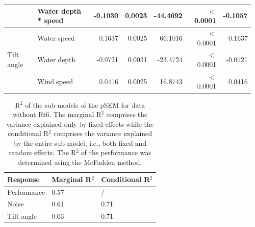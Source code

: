 \documentclass[doublespacing,linenumbers]{bmcart}
\begin{document}
\begin{backmatter}
\begin{table}[]
\begin{tabular}{llrrrrr}
                               & Water depth * speed  & -0.1030  & 0.0023 & -44.4692   & $<$0.0001            & -0.1057  \\ \hline
\multirow{3}{*}{Tilt angle}    & Water speed          & 0.1637  & 0.0025 & 66.1016  & $<$0.0001            & 0.1637  \\
                               & Water depth            & -0.0721 & 0.0031 & -23.4724 & $<$0.0001            & -0.0721 \\
                               & Wind speed              & 0.0416  & 0.0025 & 16.8743  & $<$0.0001            & 0.0416  \\ \hline
\end{tabular}
\label{tab:pSEM}
\end{table}

\begin{table}[]
\centering
\caption{R$^{2}$ of the sub-models of the pSEM for data without Rt6. The marginal R$^{2}$ comprises the variance explained only by fixed effects while the conditional R$^{2}$ comprises the variance explained by the entire sub-model, i.e., both fixed and random effects. The R$^{2}$ of the performance was determined using the McFadden method.}
\begin{tabular}{lll}
\hline
Response      & Marginal R$^{2}$ & Conditional R$^{2}$ \\ \hline
Performance & 0.57        & /              \\ 
Noise         & 0.61        & 0.71           \\ 
Tilt angle    & 0.03        & 0.71           \\ \hline
\end{tabular}
\end{table}


\end{backmatter}
\end{document}
